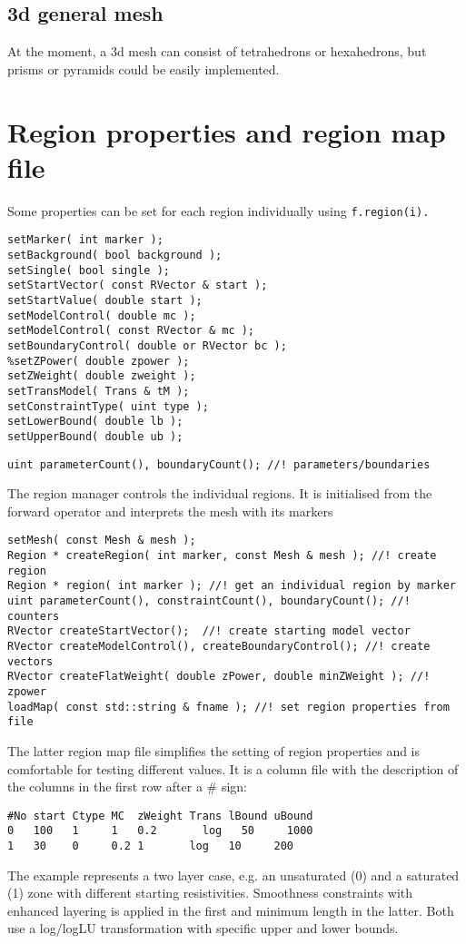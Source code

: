 \subsection*{3d general mesh}
At the moment, a 3d mesh can consist of tetrahedrons or hexahedrons, but prisms or pyramids could be easily implemented.

\clearpage
\section{Region properties and region map file}\label{app:regions}
Some properties can be set for each region individually using \lstinline|f.region(i).|
\begin{lstlisting}
setMarker( int marker );
setBackground( bool background );
setSingle( bool single );
setStartVector( const RVector & start );
setStartValue( double start );
setModelControl( double mc );
setModelControl( const RVector & mc );
setBoundaryControl( double or RVector bc );
%setZPower( double zpower );
setZWeight( double zweight );
setTransModel( Trans & tM );
setConstraintType( uint type );
setLowerBound( double lb );
setUpperBound( double ub );
\end{lstlisting}

\begin{lstlisting}
uint parameterCount(), boundaryCount(); //! parameters/boundaries
\end{lstlisting}

The region manager controls the individual regions.
It is initialised from the forward operator and interprets the mesh with its markers
\begin{lstlisting}
setMesh( const Mesh & mesh );
Region * createRegion( int marker, const Mesh & mesh ); //! create region
Region * region( int marker ); //! get an individual region by marker
uint parameterCount(), constraintCount(), boundaryCount(); //! counters
RVector createStartVector();  //! create starting model vector
RVector createModelControl(), createBoundaryControl(); //! create vectors
RVector createFlatWeight( double zPower, double minZWeight ); //! zpower
loadMap( const std::string & fname ); //! set region properties from file
\end{lstlisting}

The latter region map file simplifies the setting of region properties and is comfortable for testing different values.
It is a column file with the description of the columns in the first row after a \# sign:
\begin{verbatim}
#No start Ctype MC  zWeight Trans lBound uBound
0   100   1     1   0.2  	  log   50     1000
1   30    0     0.2 1       log   10     200
\end{verbatim}
The example represents a two layer case, e.g. an unsaturated (0) and a saturated (1) zone with different starting resistivities.
Smoothness constraints with enhanced layering is applied in the first and minimum length in the latter.
Both use a log/logLU transformation with specific upper and lower bounds.

